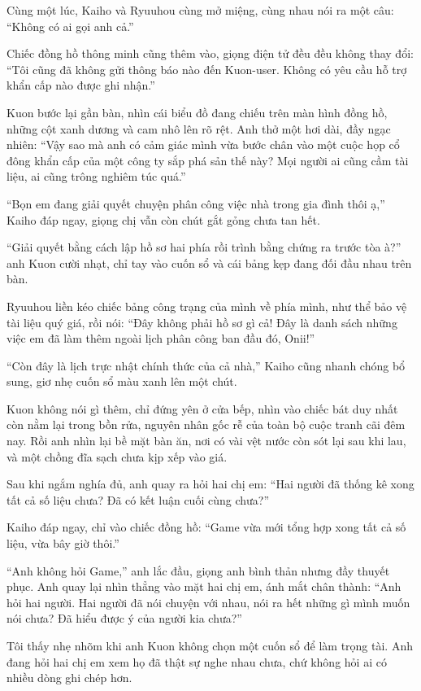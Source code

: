 \documentclass[../main.tex]{subfiles}
\begin{document}
Cùng một lúc, Kaiho và Ryuuhou cùng mở miệng, cùng nhau nói ra một câu: ``Không có ai gọi anh cả.''

Chiếc đồng hồ thông minh cũng thêm vào, giọng điện tử đều đều không thay đổi: ``Tôi cũng đã không gửi thông báo nào đến Kuon-user. Không có yêu cầu hỗ trợ khẩn cấp nào được ghi nhận.''

Kuon bước lại gần bàn, nhìn cái biểu đồ đang chiếu trên màn hình đồng hồ, những cột xanh dương và cam nhô lên rõ rệt. Anh thở một hơi dài, đầy ngạc nhiên: ``Vậy sao mà anh có cảm giác mình vừa bước chân vào một cuộc họp cổ đông khẩn cấp của một công ty sắp phá sản thế này? Mọi người ai cũng cầm tài liệu, ai cũng trông nghiêm túc quá.''

``Bọn em đang giải quyết chuyện phân công việc nhà trong gia đình thôi ạ,'' Kaiho đáp ngay, giọng chị vẫn còn chút gắt gỏng chưa tan hết.

``Giải quyết bằng cách lập hồ sơ hai phía rồi trình bằng chứng ra trước tòa à?'' anh Kuon cười nhạt, chỉ tay vào cuốn sổ và cái bảng kẹp đang đối đầu nhau trên bàn.

Ryuuhou liền kéo chiếc bảng công trạng của mình về phía mình, như thể bảo vệ tài liệu quý giá, rồi nói: ``Đây không phải hồ sơ gì cả! Đây là danh sách những việc em đã làm thêm ngoài lịch phân công ban đầu đó, Onii!''

``Còn đây là lịch trực nhật chính thức của cả nhà,'' Kaiho cũng nhanh chóng bổ sung, giơ nhẹ cuốn sổ màu xanh lên một chút.

Kuon không nói gì thêm, chỉ đứng yên ở cửa bếp, nhìn vào chiếc bát duy nhất còn nằm lại trong bồn rửa, nguyên nhân gốc rễ của toàn bộ cuộc tranh cãi đêm nay. Rồi anh nhìn lại bề mặt bàn ăn, nơi có vài vệt nước còn sót lại sau khi lau, và một chồng đĩa sạch chưa kịp xếp vào giá.

Sau khi ngắm nghía đủ, anh quay ra hỏi hai chị em: ``Hai người đã thống kê xong tất cả số liệu chưa? Đã có kết luận cuối cùng chưa?''

Kaiho đáp ngay, chỉ vào chiếc đồng hồ: ``Game vừa mới tổng hợp xong tất cả số liệu, vừa bây giờ thôi.''

``Anh không hỏi Game,'' anh lắc đầu, giọng anh bình thản nhưng đầy thuyết phục. Anh quay lại nhìn thẳng vào mặt hai chị em, ánh mắt chân thành: ``Anh hỏi hai người. Hai người đã nói chuyện với nhau, nói ra hết những gì mình muốn nói chưa? Đã hiểu được ý của người kia chưa?''

Tôi thấy nhẹ nhõm khi anh Kuon không chọn một cuốn sổ để làm trọng tài. Anh đang hỏi hai chị em xem họ đã thật sự nghe nhau chưa, chứ không hỏi ai có nhiều dòng ghi chép hơn.
\end{document}
